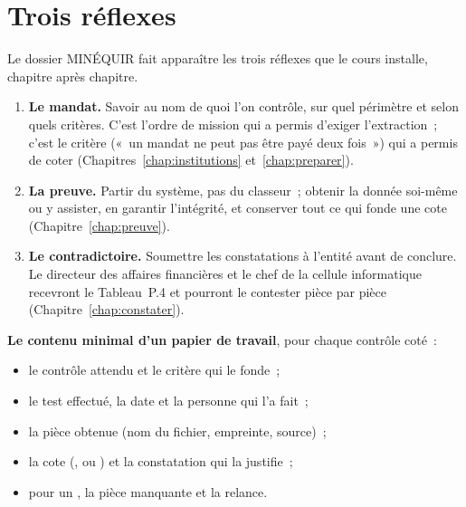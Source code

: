 \separateur

\section{Trois réflexes}
\label{sec:pro-reflexes}

Le dossier MINÉQUIR fait apparaître les trois réflexes que le cours
installe, chapitre après chapitre.

\begin{enumerate}
    \item \textbf{Le mandat.} Savoir au nom de quoi l'on contrôle, sur quel
          périmètre et selon quels critères. C'est l'ordre de mission qui
          a permis d'exiger l'extraction~; c'est le critère («~un mandat
          ne peut pas être payé deux fois~») qui a permis de coter
          (Chapitres~\ref{chap:institutions} et~\ref{chap:preparer}).
    \item \textbf{La preuve.} Partir du système, pas du classeur~;
          obtenir la donnée soi-même ou y assister, en garantir
          l'intégrité, et conserver tout ce qui fonde une cote
          (Chapitre~\ref{chap:preuve}).
    \item \textbf{Le contradictoire.} Soumettre les constatations à
          l'entité avant de conclure. Le directeur des affaires
          financières et le chef de la cellule informatique recevront le
          Tableau~P.4 et pourront le contester pièce par pièce
          (Chapitre~\ref{chap:constater}).
\end{enumerate}

\begin{boxprocedure}
\textbf{Le contenu minimal d'un papier de travail}, pour chaque contrôle
coté~:
\begin{itemize}
    \item le contrôle attendu et le critère qui le fonde~;
    \item le test effectué, la date et la personne qui l'a fait~;
    \item la pièce obtenue (nom du fichier, empreinte, source)~;
    \item la cote (\OUI{}, \NON{} ou \NEK{}) et la constatation qui la
          justifie~;
    \item pour un \NEK{}, la pièce manquante et la relance.
\end{itemize}
\end{boxprocedure}

